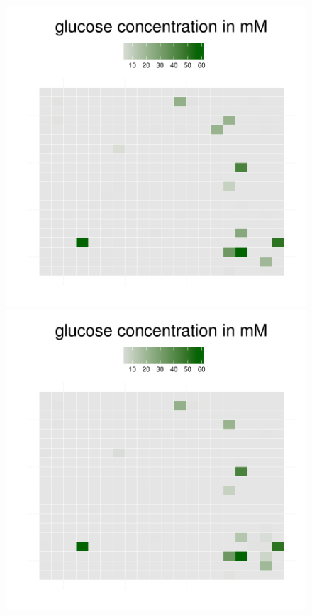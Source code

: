 \begin{figure}[h!]
{\begin{minipage}[t]{0.3\textwidth}
  \end{minipage}
  \begin{minipage}[t]{0.3\textwidth}
    \includegraphics[width=\textwidth]{../results/barkeri_beijerinckii_20x20_seed6764_gluc100.pdf}
  \end{minipage}
  \begin{minipage}[t]{0.3\textwidth}
    \includegraphics[width=\textwidth]{../results/barkeri_beijerinckii_20x20_seed6764_gluc150.pdf}

\end{minipage}}
\end{figure}
